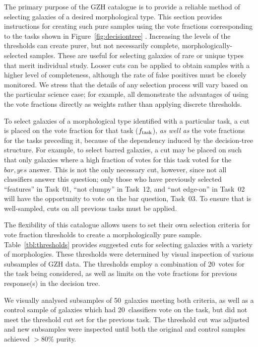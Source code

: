 \documentclass[a4paper,fleqn,usenatbib]{mnras}
\begin{document}
The primary purpose of the GZH catalogue is to provide a reliable method of
selecting galaxies of a desired morphological type.  This section provides
instructions for creating such pure samples using the vote fractions
corresponding to the tasks shown in Figure~\ref{fig:decisiontree}
\citep[eg,][]{mas11c,che15,gal15}. Increasing the levels of the thresholds can
create purer, but not necessarily complete, morphologically-selected samples.
These are useful for selecting galaxies of rare or unique types that merit
individual study.  Looser cuts can be applied to obtain samples with a higher
level of completeness, although the rate of false positives must be closely
monitored.  We stress that the details of any selection process will vary based
on the particular science case; for example, \citet{bam09,ski09,sme15} all
demonstrate the advantages of using the vote fractions directly as weights
rather than applying discrete thresholds.

To select galaxies of a morphological type identified with a particular task, a
cut is placed on the vote fraction for that task ($f_{\rm task}$), \emph{as
well as} the vote fractions for the tasks preceding it, because of the
dependency induced by the decision-tree structure. For example, to select
barred galaxies, a cut may be placed on \fbar{} such that only galaxies where a
high fraction of votes for this task voted for the $bar,yes$ answer. This is
not the only necessary cut, however, since not all classifiers answer this question;
only those who have previously selected ``features'' in Task~01, ``not clumpy''
in Task~12, and ``not edge-on'' in Task~02 will have the opportunity to vote on
the bar question, Task~03. To ensure that \fbar{} is well-sampled, cuts on all
previous tasks must be applied. 

The flexibility of this catalogue allows users to set their own selection
criteria for vote fraction thresholds to create a morphologically pure sample.
Table~\ref{tbl:thresholds} provides suggested cuts for selecting galaxies with a
variety of morphologies. These thresholds were determined by visual inspection
of various subsamples of GZH data. The thresholds employ a combination of 20~votes for the
task being considered, as well as limits on the vote fractions for previous
response(s) in the decision tree. 

We visually analysed subsamples of 50~galaxies meeting both
criteria, as well as a control sample of galaxies which had 20~classifiers vote on
the task, but did not meet the threshold cut set for the previous task. The
threshold cut was adjusted and new subsamples were inspected until both the
original and control samples achieved $>80\%$ purity.
\end{document}
